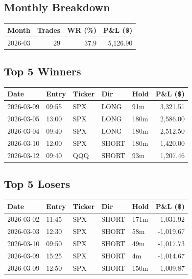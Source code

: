 \documentclass[11pt,a4paper,twoside]{article}
\begin{document}
\subsection*{Monthly Breakdown}
\noindent\begin{center}
\begin{tabular}{>{\color{txtmain}}l rrr}
\toprule
\rowcolor{cardbg}
\textbf{Month} & \textbf{Trades} & \textbf{WR (\%)} & \textbf{P\&L (\$)} \\
\midrule
2026-03 & 29 & 37.9 & \textcolor{wingreen}{5,126.90} \\
\bottomrule
\end{tabular}
\end{center}
\subsection*{Top 5 Winners}
\noindent\begin{center}
\begin{tabular}{>{\color{txtmain}}l llll r}
\toprule
\rowcolor{cardbg}
\textbf{Date} & \textbf{Entry} & \textbf{Ticker} & \textbf{Dir} & \textbf{Hold} & \textbf{P\&L (\$)} \\
\midrule
2026-03-09 & 09:55 & SPX & LONG & 91m & \textcolor{wingreen}{3,321.51} \\
2026-03-05 & 13:00 & SPX & LONG & 180m & \textcolor{wingreen}{2,586.00} \\
2026-03-04 & 09:40 & SPX & LONG & 180m & \textcolor{wingreen}{2,512.50} \\
2026-03-10 & 12:00 & SPX & SHORT & 180m & \textcolor{wingreen}{1,420.00} \\
2026-03-12 & 09:40 & QQQ & SHORT & 93m & \textcolor{wingreen}{1,207.46} \\
\bottomrule
\end{tabular}
\end{center}
\subsection*{Top 5 Losers}
\noindent\begin{center}
\begin{tabular}{>{\color{txtmain}}l llll r}
\toprule
\rowcolor{cardbg}
\textbf{Date} & \textbf{Entry} & \textbf{Ticker} & \textbf{Dir} & \textbf{Hold} & \textbf{P\&L (\$)} \\
\midrule
2026-03-02 & 11:45 & SPX & SHORT & 171m & \textcolor{lossred}{-1,031.92} \\
2026-03-03 & 12:30 & SPX & SHORT & 58m & \textcolor{lossred}{-1,019.67} \\
2026-03-10 & 09:50 & SPX & SHORT & 49m & \textcolor{lossred}{-1,017.73} \\
2026-03-09 & 15:25 & SPX & SHORT & 4m & \textcolor{lossred}{-1,014.67} \\
2026-03-09 & 12:50 & SPX & SHORT & 150m & \textcolor{lossred}{-1,009.87} \\
\bottomrule
\end{tabular}
\end{center}
\clearpage
\end{document}
